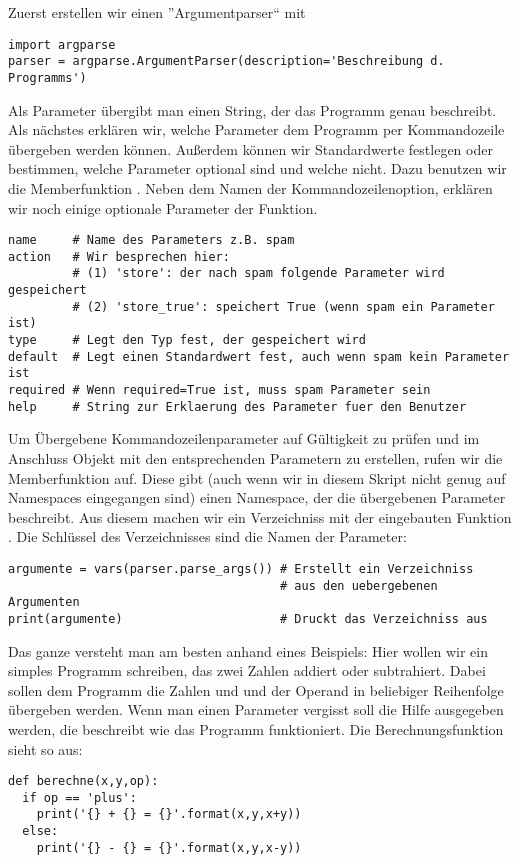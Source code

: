 Zuerst erstellen wir einen ''Argumentparser`` mit
\begin{lstlisting}
import argparse
parser = argparse.ArgumentParser(description='Beschreibung d. Programms')
\end{lstlisting}
Als Parameter  übergibt man einen String, der das Programm genau beschreibt.
Als nächstes erklären wir, welche Parameter dem Programm per Kommandozeile übergeben werden können.
Außerdem können wir Standardwerte festlegen oder bestimmen, welche Parameter optional sind und welche nicht.
Dazu benutzen wir die Memberfunktion .
Neben dem Namen der Kommandozeilenoption, erklären wir noch einige optionale Parameter der Funktion.
\begin{lstlisting}
name     # Name des Parameters z.B. spam
action   # Wir besprechen hier:
         # (1) 'store': der nach spam folgende Parameter wird gespeichert
         # (2) 'store_true': speichert True (wenn spam ein Parameter ist)
type     # Legt den Typ fest, der gespeichert wird
default  # Legt einen Standardwert fest, auch wenn spam kein Parameter ist
required # Wenn required=True ist, muss spam Parameter sein
help     # String zur Erklaerung des Parameter fuer den Benutzer
\end{lstlisting}
Um Übergebene Kommandozeilenparameter auf Gültigkeit zu prüfen und im Anschluss Objekt mit den entsprechenden Parametern zu erstellen, rufen wir die Memberfunktion  auf.
Diese gibt (auch wenn wir in diesem Skript nicht genug auf Namespaces eingegangen sind) einen Namespace, der die übergebenen Parameter beschreibt.
Aus diesem machen wir ein Verzeichniss mit der eingebauten Funktion .
Die Schlüssel des Verzeichnisses sind die Namen der Parameter:
\begin{lstlisting}
argumente = vars(parser.parse_args()) # Erstellt ein Verzeichniss
                                      # aus den uebergebenen Argumenten
print(argumente)                      # Druckt das Verzeichniss aus
\end{lstlisting}
Das ganze versteht man am besten anhand eines Beispiels:
Hier wollen wir ein simples Programm schreiben, das zwei Zahlen addiert oder subtrahiert.
Dabei sollen dem Programm die Zahlen  und  und der Operand  in beliebiger Reihenfolge übergeben werden.
Wenn man einen Parameter vergisst soll die Hilfe ausgegeben werden, die beschreibt wie das Programm funktioniert.
Die Berechnungsfunktion sieht so aus:
\begin{lstlisting}
def berechne(x,y,op):
  if op == 'plus':
    print('{} + {} = {}'.format(x,y,x+y))
  else:
    print('{} - {} = {}'.format(x,y,x-y))
\end{lstlisting}
